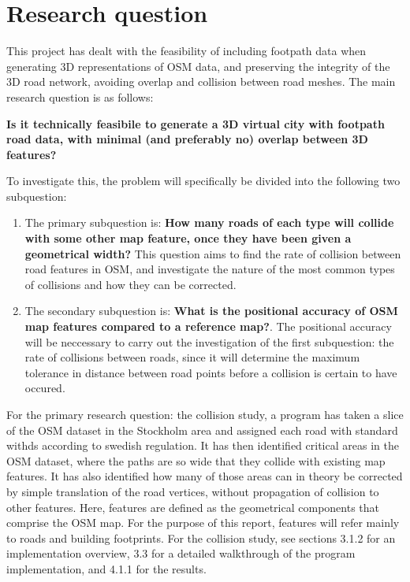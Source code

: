 \documentclass{kththesis}
\begin{document}
\section{Research question}

This project has dealt with the feasibility of including footpath data when generating 3D representations of OSM data, and preserving the integrity of the 3D road network, avoiding overlap and collision between road meshes. The main research question is as follows:
\begin{center}
    \textbf{Is it technically feasibile to generate a 3D virtual city with footpath road data, with minimal (and preferably no) overlap between 3D features?}
\end{center}

To investigate this, the problem will specifically be divided into the following two subquestion:

\begin{enumerate}
    \item The primary subquestion is: \textbf{How many roads of each type will collide with some other map feature, once they have been given a geometrical width?} This question aims to find the rate of collision between road features in OSM, and investigate the nature of the most common types of collisions and how they can be corrected.
    \item The secondary subquestion is: \textbf{What is the positional accuracy of OSM map features compared to a reference map?}. The positional accuracy will be neccessary to carry out the investigation of the first subquestion: the rate of collisions between roads, since it will determine the maximum tolerance in distance between road points before a collision is certain to have occured.
\end{enumerate}

For the primary research question: the collision study, a program has taken a slice of the OSM dataset in the Stockholm area and assigned each road with standard withds according to swedish regulation.
It has then identified critical areas in the OSM dataset, where the paths are so wide that they collide with existing map features.
It has also identified how many of those areas can in theory be corrected by simple translation of the road vertices, without propagation of collision to other features.
Here, features are defined as the geometrical components that comprise the OSM map.
For the purpose of this report, features will refer mainly to roads and building footprints.
For the collision study, see sections 3.1.2 for an implementation overview, 3.3 for a detailed walkthrough of the program implementation, and 4.1.1 for the results.
\end{document}
